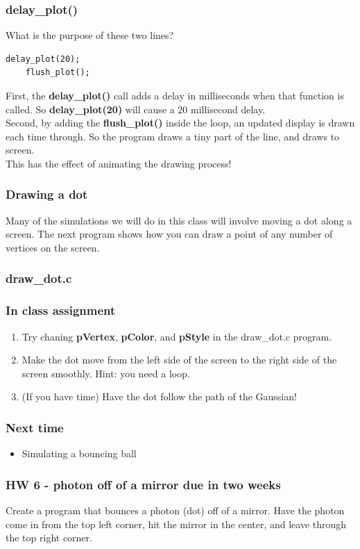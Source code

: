 \documentclass{beamer}
\begin{document}
\begin{frame}[fragile]
  \frametitle{delay\_plot()}
  What is the purpose of these two lines?
  \begin{lstlisting}[style=customc]
    delay_plot(20);
    flush_plot();
  \end{lstlisting}
  First, the \textbf{delay\_plot()} call adds a delay in milliseconds
  when that function is called. So \textbf{delay\_plot(20)} will cause a 
  20 millisecond delay.\\
  Second, by adding the \textbf{flush\_plot()} inside the loop, an updated
  display is drawn each time through. So the program draws a tiny part of the
  line, and draws to screen.\\
  This has the effect of animating the drawing process!
\end{frame}

\begin{frame}
  \frametitle{Drawing a dot}
  Many of the simulations we will do in this class will involve moving
  a dot along a screen. The next program shows how you can draw a
  point of any number of vertices on the screen.
\end{frame}

\begin{frame}
  \frametitle{draw\_dot.c}
  
\end{frame}

\begin{frame}
  \frametitle{In class assignment}
  \begin{enumerate}
    \item Try chaning \textbf{pVertex}, \textbf{pColor}, and
      \textbf{pStyle} in the draw\_dot.c program.
    \item Make the dot move from the left side of the screen
      to the right side of the screen smoothly. Hint: you need
      a loop.
    \item (If you have time) Have the dot follow the path of the Gaussian!
  \end{enumerate}
\end{frame}

\begin{frame}
  \frametitle{Next time}
  \begin{itemize}
  \item Simulating a bouncing ball
  \end{itemize}

\end{frame}

\begin{frame}
  \frametitle{HW 6 - photon off of a mirror due in two weeks}
  Create a program that bounces a photon (dot) off of a mirror. Have
  the photon come in from the top left corner, hit the mirror in the center,
  and leave through the top right corner.
\end{frame}
\end{document}
